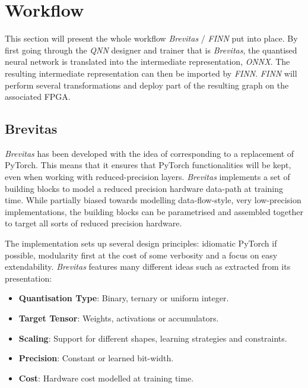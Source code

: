 \section{Workflow}

This section will present the whole workflow \emph{Brevitas} / \emph{FINN} put into place. By first going through the \emph{QNN} designer and trainer that is \emph{Brevitas}, the quantised neural network is translated into the intermediate representation, \emph{ONNX}. The resulting intermediate representation can then be imported by \emph{FINN}. \emph{FINN} will perform several transformations and deploy part of the resulting graph on the associated FPGA.


\subsection{Brevitas}

\emph{Brevitas} has been developed with the idea of corresponding to a  replacement of PyTorch. This means that it ensures that PyTorch functionalities will be kept, even when working with reduced-precision layers. \emph{Brevitas} implements a set of building blocks to model a reduced precision hardware data-path at training time. While partially biased towards modelling data-flow-style, very low-precision implementations, the building blocks can be parametrised and assembled together to target all sorts of reduced precision hardware.

The implementation sets up several design principles: idiomatic PyTorch if possible, modularity first at the cost of some verbosity and a focus on easy extendability. \emph{Brevitas} features many different ideas such as extracted from its presentation:
\begin{itemize}
  \item \textbf{Quantisation Type}: Binary, ternary or uniform integer.
  \item \textbf{Target Tensor}: Weights, activations or accumulators.
  \item \textbf{Scaling}: Support for different shapes, learning strategies and constraints.
  \item \textbf{Precision}: Constant or learned bit-width.
  \item \textbf{Cost}: Hardware cost modelled at training time.
\end{itemize}

